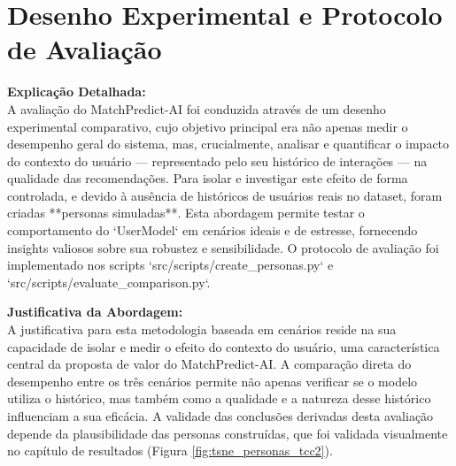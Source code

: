 \section{Desenho Experimental e Protocolo de Avaliação}
\label{sec:dev_desenho_experimental}

\textbf{Explicação Detalhada:} \\
A avaliação do MatchPredict-AI foi conduzida através de um desenho experimental comparativo, cujo objetivo principal era não apenas medir o desempenho geral do sistema, mas, crucialmente, analisar e quantificar o impacto do contexto do usuário — representado pelo seu histórico de interações — na qualidade das recomendações. Para isolar e investigar este efeito de forma controlada, e devido à ausência de históricos de usuários reais no dataset, foram criadas **personas simuladas**. Esta abordagem permite testar o comportamento do `UserModel` em cenários ideais e de estresse, fornecendo insights valiosos sobre sua robustez e sensibilidade. O protocolo de avaliação foi implementado nos scripts `src/scripts/create_personas.py` e `src/scripts/evaluate_comparison.py`.

\textbf{Justificativa da Abordagem:} \\
A justificativa para esta metodologia baseada em cenários reside na sua capacidade de isolar e medir o efeito do contexto do usuário, uma característica central da proposta de valor do MatchPredict-AI. A comparação direta do desempenho entre os três cenários permite não apenas verificar se o modelo utiliza o histórico, mas também como a qualidade e a natureza desse histórico influenciam a sua eficácia. A validade das conclusões derivadas desta avaliação depende da plausibilidade das personas construídas, que foi validada visualmente no capítulo de resultados (Figura \ref{fig:tsne_personas_tcc2}).


